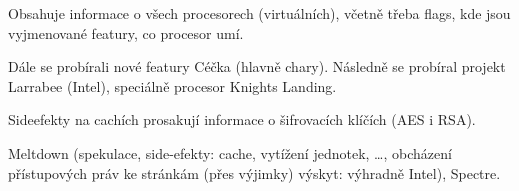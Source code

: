 \documentclass[12pt]{article}                   %
\begin{document}
        \begin{definice}
            Obsahuje informace o všech procesorech (virtuálních), včetně třeba flags, kde jsou vyjmenované featury, co procesor umí.
        \end{definice}


        Dále se probírali nové featury Céčka (hlavně chary). Následně se probíral projekt Larrabee (Intel), speciálně procesor Knights Landing.

        \begin{poznamka}
            Sideefekty na cachích prosakují informace o šifrovacích klíčích (AES i RSA).

            Meltdown (spekulace, side-efekty: cache, vytížení jednotek, …, obcházení přístupových práv ke stránkám (přes výjimky) výskyt: výhradně Intel), Spectre. 
        \end{poznamka}
\end{document}
